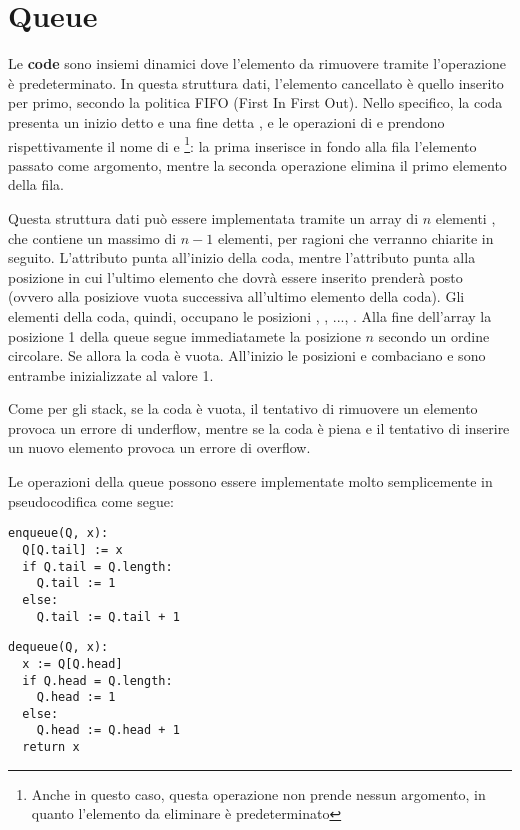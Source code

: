 \section{Queue}
Le \textbf{code} sono insiemi dinamici dove l'elemento da rimuovere tramite l'operazione  è predeterminato. In questa struttura dati, l'elemento cancellato è quello inserito per primo, secondo la politica FIFO (First In First Out). Nello specifico, la coda presenta un inizio detto  e una fine detta , e le operazioni di  e  prendono rispettivamente il nome di  e  \footnote{Anche in questo caso, questa operazione non prende nessun argomento, in quanto l'elemento da eliminare è predeterminato}: la prima inserisce in fondo alla fila l'elemento passato come argomento, mentre la seconda operazione elimina il primo elemento della fila. 

Questa struttura dati può essere implementata tramite un array di \(n\) elementi , che contiene un massimo di \(n-1\) elementi, per ragioni che verranno chiarite in seguito. L'attributo  punta all'inizio della coda, mentre l'attributo  punta alla posizione in cui l'ultimo elemento che dovrà essere inserito prenderà posto (ovvero alla posiziove vuota successiva all'ultimo elemento della coda). Gli elementi della coda, quindi, occupano le posizioni , , ..., . Alla fine dell'array la posizione 1 della queue segue immediatamete la posizione \(n\) secondo un ordine circolare. Se  allora la coda è vuota. All'inizio le posizioni  e  combaciano e sono entrambe inizializzate al valore 1.

Come per gli stack, se la coda è vuota, il tentativo di rimuovere un elemento provoca un errore di underflow, mentre se  la coda è piena e il tentativo di inserire un nuovo elemento provoca un errore di overflow. 

Le operazioni della queue possono essere implementate molto semplicemente in pseudocodifica come segue:

\begin{lstlisting}
enqueue(Q, x):
  Q[Q.tail] := x
  if Q.tail = Q.length:
    Q.tail := 1
  else:
    Q.tail := Q.tail + 1
\end{lstlisting}

\begin{lstlisting}
dequeue(Q, x):
  x := Q[Q.head]
  if Q.head = Q.length:
    Q.head := 1
  else:
    Q.head := Q.head + 1
  return x
\end{lstlisting}

